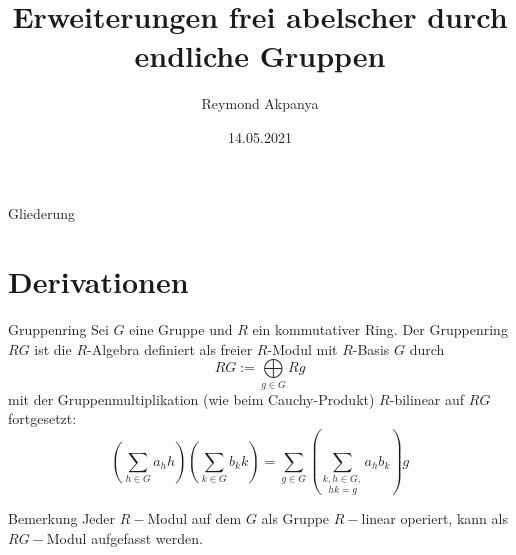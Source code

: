 \documentclass{beamer}
\author{Reymond Akpanya}
\title{Erweiterungen frei abelscher durch endliche Gruppen}
\date{14.05.2021 }
\begin{document}
\frame{\maketitle}
\begin{frame}{Gliederung}
\tableofcontents
\end{frame}
\section{Derivationen}
\begin{frame}
\begin{block}{Gruppenring}
Sei $G$ eine Gruppe und $R$ ein kommutativer Ring. Der Gruppenring $RG$ ist die $R$-Algebra definiert als freier $R$-Modul mit $R$-Basis $G$ durch 
\[
RG:=\underset{g\in G}{\bigoplus}Rg
\]
mit der Gruppenmultiplikation (wie beim Cauchy-Produkt) $R$-bilinear auf $RG$ fortgesetzt:
\[
(\sum_{h\in G}a_hh)(\sum_{k\in G}b_kk)=\sum_{g\in G}(\underset{hk=g}{\sum_{k,h\in G,}}a_h b_k)g
\]
\end{block}
\end{frame}
\begin{frame}
\begin{block}{Bemerkung}
Jeder $R-$Modul auf dem $G$ als Gruppe $R-$linear operiert, kann als $RG-$Modul aufgefasst werden.
\end{block}
\end{frame}
\end{document}
